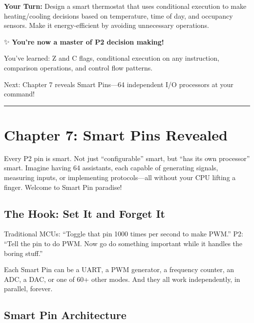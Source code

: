 \documentclass[11pt]{book}
\begin{document}
\textbf{Your Turn:} Design a smart thermostat that uses conditional
execution to make heating/cooling decisions based on temperature, time
of day, and occupancy sensors. Make it energy-efficient by avoiding
unnecessary operations.

\begin{chapterend}
✨ \textbf{You're now a master of P2 decision making!}

You've learned: Z and C flags, conditional execution on any instruction, comparison operations, and control flow patterns.

Next: Chapter 7 reveals Smart Pins—64 independent I/O processors at your command!
\end{chapterend}

\begin{center}\rule{0.5\linewidth}{0.5pt}\end{center}

\hypertarget{chapter-7-smart-pins-revealed}{%
\section{Chapter 7: Smart Pins
Revealed}\label{chapter-7-smart-pins-revealed}}

Every P2 pin is smart. Not just ``configurable'' smart, but ``has its
own processor'' smart. Imagine having 64 assistants, each capable of
generating signals, measuring inputs, or implementing protocols---all
without your CPU lifting a finger. Welcome to Smart Pin paradise!

\hypertarget{the-hook-set-it-and-forget-it}{%
\subsection{The Hook: Set It and Forget
It}\label{the-hook-set-it-and-forget-it}}

Traditional MCUs: ``Toggle that pin 1000 times per second to make PWM.''
P2: ``Tell the pin to do PWM. Now go do something important while it
handles the boring stuff.''

Each Smart Pin can be a UART, a PWM generator, a frequency counter, an
ADC, a DAC, or one of 60+ other modes. And they all work independently,
in parallel, forever.

\hypertarget{smart-pin-architecture}{%
\subsection{Smart Pin Architecture}\label{smart-pin-architecture}}
\end{document}
